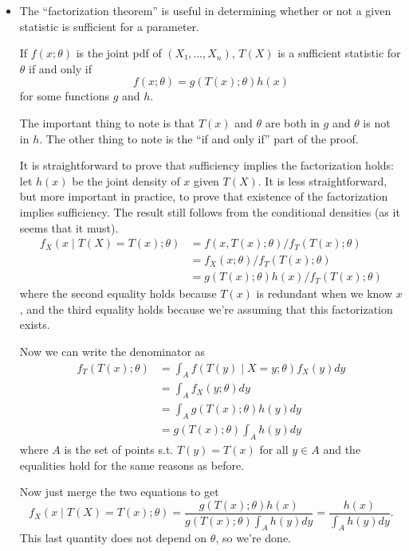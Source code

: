 \begin{itemize}
\item The ``factorization theorem'' is useful in determining whether
  or not a given statistic is sufficient for a parameter.
  \begin{thm}
    If $f(x; θ)$ is the joint pdf of $(X₁,...,X_n)$, $T(X)$ is a
    sufficient statistic for $θ$ if and only if
    \begin{equation*}
      f(x; θ) = g(T(x); θ) h(x)
    \end{equation*}
    for some functions $g$ and $h$.
  \end{thm}
  The important thing to note is that $T(x)$ and $θ$ are both in $g$
  and $θ$ is not in $h$.  The other thing to note is the ``if and only
  if'' part of the proof.

  It is straightforward to prove that sufficiency implies the
  factorization holds: let $h(x)$ be the joint density of $x$ given
  $T(X)$.  It is less straightforward, but more important in practice,
  to prove that existence of the factorization implies sufficiency.
  The result still follows from the conditional densities (as it seems
  that it must).
  \begin{align*}
    f_X(x ∣ T(X) = T(x); θ)
    &= f(x, T(x); θ) / f_T(T(x); θ) \\
    &= f_X(x; θ) / f_T(T(x); θ) \\
    &= g(T(x); θ) h(x) / f_T(T(x); θ)
  \end{align*}
  where the second equality holds because $T(x)$ is redundant when we
  know $x$, and the third equality holds because we're assuming that
  this factorization exists.

  Now we can write the denominator as
  \begin{align*}
    f_T(T(x); θ)
    &= ∫_A f(T(y) ∣ X = y; θ) f_X(y) dy \\
    &= ∫_A f_X(y; θ) dy \\
    &= ∫_A g(T(x); θ) h(y) dy \\
    &= g(T(x); θ) ∫_A h(y) dy
  \end{align*}
  where $A$ is the set of points s.t. $T(y) = T(x)$ for all $y ∈ A$
  and the equalities hold for the same reasons as before.

  Now just merge the two equations to get
  \begin{equation*}
    f_X(x ∣ T(X) = T(x); θ)
    = \frac{g(T(x); θ) h(x)}{g(T(x); θ) ∫_A h(y) dy}
    = \frac{h(x)}{∫_A h(y) dy}.
  \end{equation*}
  This last quantity does not depend on $θ$, so we're done.


\end{itemize}
